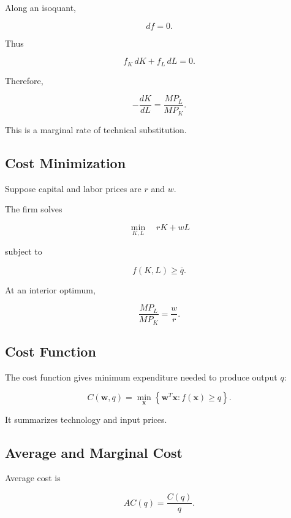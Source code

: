 Along an isoquant,

\[
df=0.
\]

Thus

\[
f_K\,dK
+
f_L\,dL
=
0.
\]

Therefore,

\[
\boxed{
-\frac{dK}{dL}
=
\frac{MP_L}{MP_K}.
}
\]

This is a marginal rate of technical substitution.

\subsection{Cost Minimization}
\label{subsec:firm-cost-minimization}

Suppose capital and labor prices are \(r\) and \(w\).

The firm solves

\[
\boxed{
\min_{K,L}
\quad
rK+wL
}
\]

subject to

\[
\boxed{
f(K,L)
\geq
\bar q.
}
\]

At an interior optimum,

\[
\boxed{
\frac{MP_L}{MP_K}
=
\frac{w}{r}.
}
\]

\subsection{Cost Function}
\label{subsec:economic-cost-function}

The cost function gives minimum expenditure needed to produce output \(q\):

\[
\boxed{
C(\mathbf{w},q)
=
\min_{\mathbf{x}}
\left\{
\mathbf{w}^T\mathbf{x}
:
f(\mathbf{x})\geq q
\right\}.
}
\]

It summarizes technology and input prices.

\subsection{Average and Marginal Cost}
\label{subsec:average-marginal-cost}

Average cost is

\[
\boxed{
AC(q)
=
\frac{C(q)}{q}.
}
\]

